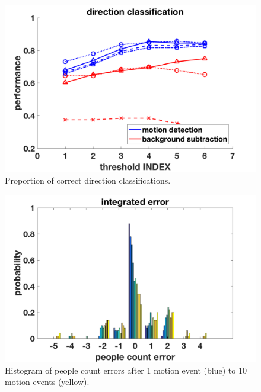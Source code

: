 \documentclass[12pt,oneside]{article} %
\begin{document}
\begin{figure}[htb]
\centering
\includegraphics[scale=0.52]{images/dirClass.png}
\caption{Proportion of correct direction classifications.}
\label{dirclass}
\end{figure}

\begin{figure}[htb]
\centering
\includegraphics[scale=0.52]{images/pcerror_gamma020_hist.png}
\caption{Histogram of people count errors after 1 motion event (blue) to 10 motion events (yellow).}
\label{hist}
\end{figure}
\end{document}
